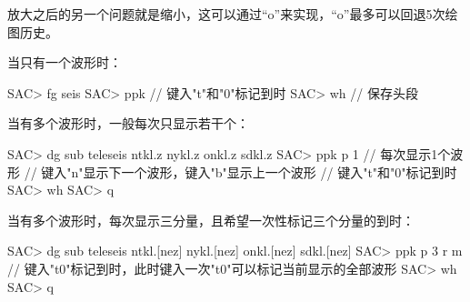 放大之后的另一个问题就是缩小，这可以通过``o''来实现，``o''最多可以回退5次绘图历史。

当只有一个波形时：
\begin{SACCode}
SAC> fg seis
SAC> ppk
// 键入"t"和"0"标记到时
SAC> wh         // 保存头段
\end{SACCode}

当有多个波形时，一般每次只显示若干个：
\begin{SACCode}
SAC> dg sub teleseis ntkl.z nykl.z onkl.z sdkl.z
SAC> ppk p 1    // 每次显示1个波形
// 键入"n"显示下一个波形，键入"b"显示上一个波形
// 键入"t"和"0"标记到时
SAC> wh
SAC> q
\end{SACCode}

当有多个波形时，每次显示三分量，且希望一次性标记三个分量的到时：
\begin{SACCode}
SAC> dg sub teleseis ntkl.[nez] nykl.[nez] onkl.[nez] sdkl.[nez]
SAC> ppk p 3 r m
// 键入"t0"标记到时，此时键入一次"t0"可以标记当前显示的全部波形
SAC> wh
SAC> q
\end{SACCode}
